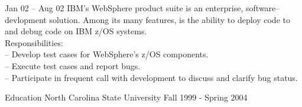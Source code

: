 \documentclass[a4paper, 10pt]{article}
\begin{document}
\begin{resume}
\begin{block}
\begin{subcategory}{Jan 02 -- Aug 02}
                IBM's WebSphere product suite is an enterprise, software--devlopment solution.  Among
                its many features, is the ability to deploy code to and debug code on IBM z/OS systems.
                \\[1ex]
                Responsibilities: \\
                -- Develop test cases for WebSphere's z/OS components. \\
                -- Execute test cases and report bugs. \\
                -- Participate in frequent call with development to discuss and clarify bug status.
                \bigskip
                \bigskip
            \end{subcategory}
        \end{block}
        \begin{block}
            \begin{category}{Education}
                 {North Carolina State University}
                        { }                        {Fall 1999 - Spring 2004}
            \end{category}
        \end{block}
    \end{resume}
\end{document}
